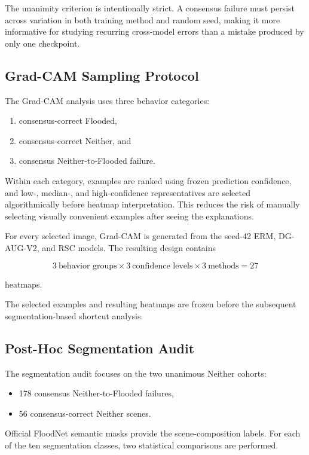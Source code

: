 The unanimity criterion is intentionally strict. A consensus failure
must persist across variation in both training method and random seed,
making it more informative for studying recurring cross-model errors
than a mistake produced by only one checkpoint.

\subsection{Grad-CAM Sampling Protocol}

The Grad-CAM analysis uses three behavior categories:

\begin{enumerate}
    \item consensus-correct Flooded,
    \item consensus-correct Neither, and
    \item consensus Neither-to-Flooded failure.
\end{enumerate}

Within each category, examples are ranked using frozen prediction
confidence, and low-, median-, and high-confidence representatives are
selected algorithmically before heatmap interpretation. This reduces
the risk of manually selecting visually convenient examples after
seeing the explanations.

For every selected image, Grad-CAM is generated from the seed-42 ERM,
DG-AUG-V2, and RSC models. The resulting design contains

\[
3\ \text{behavior groups}
\times
3\ \text{confidence levels}
\times
3\ \text{methods}
=
27
\]

heatmaps.

The selected examples and resulting heatmaps are frozen before the
subsequent segmentation-based shortcut analysis.

\subsection{Post-Hoc Segmentation Audit}

The segmentation audit focuses on the two unanimous Neither cohorts:

\begin{itemize}
    \item 178 consensus Neither-to-Flooded failures,
    \item 56 consensus-correct Neither scenes.
\end{itemize}

Official FloodNet semantic masks provide the scene-composition labels.
For each of the ten segmentation classes, two statistical comparisons
are performed.


